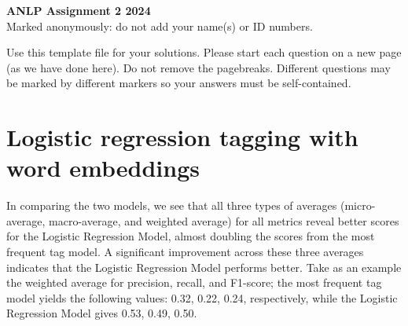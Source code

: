 \documentclass[11pt,a4paper]{article}
\begin{document}
\begin{center}
{\Large\bf ANLP Assignment 2 2024}\\ \large Marked anonymously: do not add your name(s) or ID numbers.\\[2mm]
\end{center}

Use this template file for your solutions. Please start each question on a new page (as we have done here). Do not remove the pagebreaks. Different questions may be marked by different markers so your answers must be self-contained.

\pagebreak
\section{Logistic regression tagging with word embeddings}

In comparing the two models, we see that all three types of averages (micro-average, macro-average, and weighted average) for all metrics reveal better scores for the Logistic Regression Model, almost doubling the scores from the most frequent tag model. A significant improvement across these three averages indicates that the Logistic Regression Model performs better. Take as an example the weighted average for precision, recall, and F1-score; the most frequent tag model yields the following values: 0.32, 0.22, 0.24, respectively, while the Logistic Regression Model gives 0.53, 0.49, 0.50. 

\end{document}
